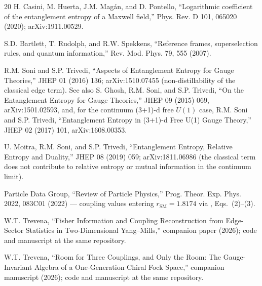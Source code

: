 \documentclass[11pt]{article}
\newcommand{\rSM}{r_{\mathrm{SM}}}
\begin{document}
\begin{thebibliography}{20}
 H. Casini, M. Huerta, J.M. Mag\'an, and D. Pontello, ``Logarithmic coefficient of the entanglement entropy of a Maxwell field,'' Phys. Rev. D 101, 065020 (2020); arXiv:1911.00529.

 S.D. Bartlett, T. Rudolph, and R.W. Spekkens, ``Reference frames, superselection rules, and quantum information,'' Rev. Mod. Phys. 79, 555 (2007).

 R.M. Soni and S.P. Trivedi, ``Aspects of Entanglement Entropy for Gauge Theories,'' JHEP 01 (2016) 136; arXiv:1510.07455 (non-distillability of the classical edge term). See also S. Ghosh, R.M. Soni, and S.P. Trivedi, ``On the Entanglement Entropy for Gauge Theories,'' JHEP 09 (2015) 069, arXiv:1501.02593, and, for the continuum (3+1)-d free $U(1)$ case, R.M. Soni and S.P. Trivedi, ``Entanglement Entropy in (3+1)-d Free U(1) Gauge Theory,'' JHEP 02 (2017) 101, arXiv:1608.00353.

 U. Moitra, R.M. Soni, and S.P. Trivedi, ``Entanglement Entropy, Relative Entropy and Duality,'' JHEP 08 (2019) 059; arXiv:1811.06986 (the classical term does not contribute to relative entropy or mutual information in the continuum limit).

 Particle Data Group, ``Review of Particle Physics,'' Prog. Theor. Exp. Phys. 2022, 083C01 (2022) --- coupling values entering $\rSM = 1.8174$ via \cite{companion}, Eqs.~(2)--(3).

 W.T. Trevena, ``Fisher Information and Coupling Reconstruction from Edge-Sector Statistics in Two-Dimensional Yang--Mills,'' companion paper (2026); code and manuscript at the same repository.

 W.T. Trevena, ``Room for Three Couplings, and Only the Room: The Gauge-Invariant Algebra of a One-Generation Chiral Fock Space,'' companion manuscript (2026); code and manuscript at the same repository.

\end{thebibliography}
\end{document}
